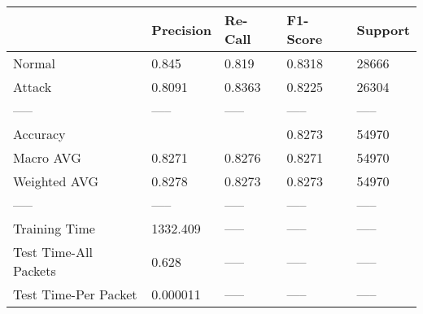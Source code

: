 \begin{tabular}{lllll}
\toprule
{} & Precision & Re-Call & F1-Score & Support \\
\midrule
Normal                &     0.845 &   0.819 &   0.8318 &   28666 \\
Attack                &    0.8091 &  0.8363 &   0.8225 &   26304 \\
-----                 &     ----- &   ----- &    ----- &   ----- \\
Accuracy              &           &         &   0.8273 &   54970 \\
Macro AVG             &    0.8271 &  0.8276 &   0.8271 &   54970 \\
Weighted AVG          &    0.8278 &  0.8273 &   0.8273 &   54970 \\
-----                 &     ----- &   ----- &    ----- &   ----- \\
Training Time         &  1332.409 &   ----- &    ----- &   ----- \\
Test Time-All Packets &     0.628 &   ----- &    ----- &   ----- \\
Test Time-Per Packet  &  0.000011 &   ----- &    ----- &   ----- \\
\bottomrule
\end{tabular}
